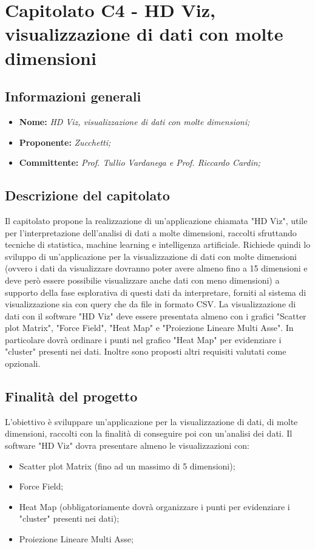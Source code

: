 \section{Capitolato C4 - HD Viz, visualizzazione di dati con molte dimensioni}
\subsection{Informazioni generali}
	\begin{itemize}
	\item \textbf{Nome:} \textit{HD Viz, visualizzazione di dati con molte dimensioni;}
	\item \textbf{Proponente:} \textit{Zucchetti;}
	\item \textbf{Committente:}  \textit{Prof. Tullio Vardanega e Prof. Riccardo Cardin;}
	\end{itemize}
\subsection{Descrizione del capitolato}
Il capitolato propone la realizzazione di un'applicazione chiamata "HD Viz", utile per l'interpretazione dell'analisi di dati a molte dimensioni, raccolti sfruttando tecniche di statistica, machine learning e intelligenza artificiale. 
Richiede quindi lo sviluppo di un'applicazione per la visualizzazione di dati con molte dimensioni (ovvero i dati da visualizzare dovranno poter avere almeno fino a 15 dimensioni e deve però essere possibilie visualizzare anche dati con meno dimensioni) a supporto della fase esplorativa di questi dati da interpretare, forniti al sistema di visualizzazione sia con query che da file in formato CSV.
La visualizzazione di dati con il software "HD Viz" deve essere presentata almeno con i grafici "Scatter plot Matrix", "Force Field", "Heat Map" e "Proiezione Lineare Multi Asse". In particolare dovrà ordinare i punti nel grafico "Heat Map" per evidenziare i "cluster" presenti nei dati.
Inoltre sono proposti altri requisiti valutati come opzionali.
\subsection{Finalità del progetto}
L'obiettivo è sviluppare un'applicazione per la visualizzazione di dati, di molte dimensioni, raccolti con la finalità di conseguire poi con un'analisi dei dati.
Il software "HD Viz" dovra presentare almeno le visualizzazioni con:
\begin{itemize}
\item Scatter plot Matrix (fino ad un massimo di 5 dimensioni);
\item Force Field;
\item Heat Map (obbligatoriamente dovrà organizzare i punti per evidenziare i "cluster" presenti nei dati);
\item Proiezione Lineare Multi Asse;
\end{itemize}
